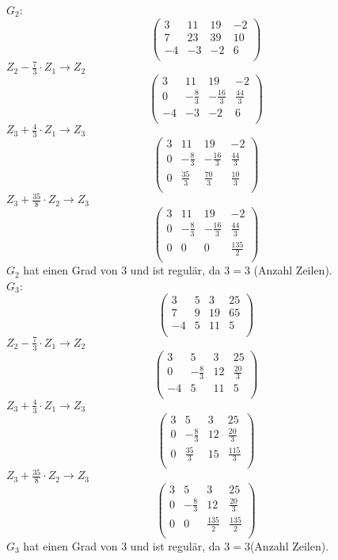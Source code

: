 \documentclass{article}
\begin{document}
\newline
$G_2$:
\[\left(\begin{matrix}
    3 & 11 & 19 & -2 \\ 
    7 & 23 & 39 & 10 \\
    -4 & -3 & -2 & 6 \\
\end{matrix}\right)\]
$Z_2 - \frac{7}{3}\cdot Z_1 \to Z_2$
\[\left(\begin{matrix}
    3 & 11 & 19 & -2 \\ 
    0 & -\frac{8}{3} & -\frac{16}{3} & \frac{44}{3} \\
    -4 & -3 & -2 & 6 \\
\end{matrix}\right)\]
$Z_3 + \frac{4}{3} \cdot Z_1 \to Z_3$
\[\left(\begin{matrix}
    3 & 11 & 19 & -2 \\ 
    0 & -\frac{8}{3} & -\frac{16}{3} & \frac{44}{3} \\
    0 & \frac{35}{3} & \frac{70}{3} & \frac{10}{3} \\
\end{matrix}\right)\]
$Z_3 + \frac{35}{8} \cdot Z_2 \to Z_3$
\[\left(\begin{matrix}
    3 & 11 & 19 & -2 \\ 
    0 & -\frac{8}{3} & -\frac{16}{3} & \frac{44}{3} \\
    0 & 0 & 0 & \frac{135}{2} \\
\end{matrix}\right)\]
$G_2$ hat einen Grad von 3 und ist regulär, da $3 = 3$ (Anzahl Zeilen). \\
\newline
$G_3$:
\[\left(\begin{matrix}
    3 & 5 & 3 & 25 \\ 
    7 & 9 & 19 & 65 \\
    -4 & 5 & 11 & 5 \\
\end{matrix}\right)\]
$Z_2 - \frac{7}{3} \cdot Z_1 \to Z_2$
\[\left(\begin{matrix}
    3 & 5 & 3 & 25 \\ 
    0 & -\frac{8}{3} & 12 & \frac{20}{3} \\
    -4 & 5 & 11 & 5 \\
\end{matrix}\right)\]
$Z_3 + \frac{4}{3} \cdot Z_1 \to Z_3$
\[\left(\begin{matrix}
    3 & 5 & 3 & 25 \\ 
    0 & -\frac{8}{3} & 12 & \frac{20}{3} \\
    0 & \frac{35}{3} & 15 & \frac{115}{3} \\
\end{matrix}\right)\]
$Z_3 + \frac{35}{8} \cdot Z_2 \to Z_3$
\[\left(\begin{matrix}
    3 & 5 & 3 & 25 \\ 
    0 & -\frac{8}{3} & 12 & \frac{20}{3} \\
    0 & 0 & \frac{135}{2} & \frac{135}{2} \\
\end{matrix}\right)\]
$G_3$ hat einen Grad von 3 und ist regulär, da $3 = 3$(Anzahl Zeilen).
\end{document}
